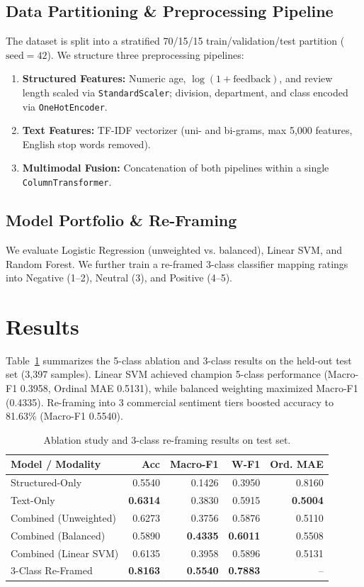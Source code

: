 \documentclass[conference]{IEEEtran}
\begin{document}
\subsection{Data Partitioning & Preprocessing Pipeline}
The dataset is split into a stratified 70/15/15 train/validation/test partition ($\text{seed}=42$).
We structure three preprocessing pipelines:
\begin{enumerate}
\item \textbf{Structured Features:} Numeric age, $\log(1 + \text{feedback})$, and review length scaled via \texttt{StandardScaler}; division, department, and class encoded via \texttt{OneHotEncoder}.
\item \textbf{Text Features:} TF-IDF vectorizer (uni- and bi-grams, max 5,000 features, English stop words removed).
\item \textbf{Multimodal Fusion:} Concatenation of both pipelines within a single \texttt{ColumnTransformer}.
\end{enumerate}

\subsection{Model Portfolio & Re-Framing}
We evaluate Logistic Regression (unweighted vs. balanced), Linear SVM, and Random Forest. We further train a re-framed 3-class classifier mapping ratings into Negative (1--2), Neutral (3), and Positive (4--5).

\section{Results}
Table~\ref{tab:results} summarizes the 5-class ablation and 3-class results on the held-out test set (3,397 samples). Linear SVM achieved champion 5-class performance (Macro-F1 0.3958, Ordinal MAE 0.5131), while balanced weighting maximized Macro-F1 (0.4335). Re-framing into 3 commercial sentiment tiers boosted accuracy to 81.63\% (Macro-F1 0.5540).

\begin{table}[htbp]
\caption{Ablation study and 3-class re-framing results on test set.}
\label{tab:results}
\centering
\begin{tabular}{lrrrr}
\toprule
\textbf{Model / Modality} & \textbf{Acc} & \textbf{Macro-F1} & \textbf{W-F1} & \textbf{Ord. MAE} \\
\midrule
Structured-Only & 0.5540 & 0.1426 & 0.3950 & 0.8160 \\
Text-Only & \textbf{0.6314} & 0.3830 & 0.5915 & \textbf{0.5004} \\
Combined (Unweighted) & 0.6273 & 0.3756 & 0.5876 & 0.5110 \\
Combined (Balanced) & 0.5890 & \textbf{0.4335} & \textbf{0.6011} & 0.5508 \\
Combined (Linear SVM) & 0.6135 & 0.3958 & 0.5896 & 0.5131 \\
\midrule
3-Class Re-Framed & \textbf{0.8163} & \textbf{0.5540} & \textbf{0.7883} & -- \\
\bottomrule
\end{tabular}
\end{table}
\end{document}

